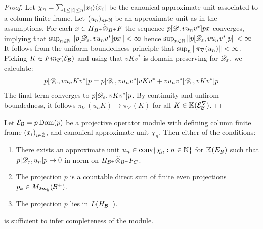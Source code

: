 \begin{proof}
	 Let $\chi_n=\sum_{1\leq |i|\leq n}\lvert x_i \rangle\langle x_i \rvert$ be the canonical approximate unit associated to a column finite frame. Let $(u_n)_{n\in \mathbb{N}}$ be an approximate unit as in the assumptions. 
	 For each $x\in H_{B^+}\widetilde{\otimes}_{B^+} F$ the sequence $p[\mathscr{D},vu_nv^*]px$ converges, implying that $\sup_{n\in \mathbb{N}} \left \Vert p[\mathscr{D}_\varepsilon,vu_nv^*]px \right \Vert<\infty$ hence $\sup_{n\in \mathbb{N}} \left \Vert p[\mathscr{D}_\varepsilon,vu_nv^*]p \right \Vert<\infty$ 	 
	 It follows from the uniform boundedness principle that $\sup_{n}\left \Vert \pi_\nabla(u_n) \right \Vert<\infty$.
	 Picking $K\in Fin_{\mathcal{B}}(\mathcal{E}_{\mathcal{B}})$ and using that $vKv^*$ is domain preserving for $\mathscr{D}_\varepsilon$, we calculate:
	 \begin{align*}
		p[\mathscr{D}_\varepsilon,vu_nKv^*]p=p[\mathscr{D}_\varepsilon,vu_nv^*]vKv^*+vu_nv^*[\mathscr{D}_\varepsilon,vKv^*]p
	 \end{align*}
	 The final term converges to $p[\mathscr{D}_\varepsilon,vKv^*]p$. By continuity and unfirom boundedness, it follows $\pi_\nabla(u_nK)\to \pi_\nabla(K)$ for all $K\in \mathbb{K}(\mathcal{E}^\nabla_{\mathcal{B}})$. 
\end{proof}
\begin{proposition}
	Let $\mathcal{E}_{\mathcal{B}}=p\operatorname{Dom} (p)$ be a projective operator module with defining column finite frame $(x_i)_{i\in \hat{\mathbb{Z}}}$, and canonical approximate unit $\chi_n$. Then either of the conditions:
	\begin{enumerate}
		\item
			There exists an approximate unit $u_n\in \operatorname{conv}\{\chi_n : n\in \mathbb{N}\}$ for $\mathbb{K}(E_B)$ such that $p[\mathscr{D}_\varepsilon,u_n]p\to 0$ in norm on $H_{\mathcal{B}^+}\widetilde{\otimes}_{\mathcal{B}^+} F_C$. 
		\item
			The projection $p$ is a countable direct sum of finite even projections $p_k\in M_{2m_k}(\mathcal{B}^+)$. 
		\item
			The projection $p$ lies in $L(H_{\mathcal{B}^+})$. 
	\end{enumerate}
	is sufficient to infer completeness of the module.
\end{proposition}
